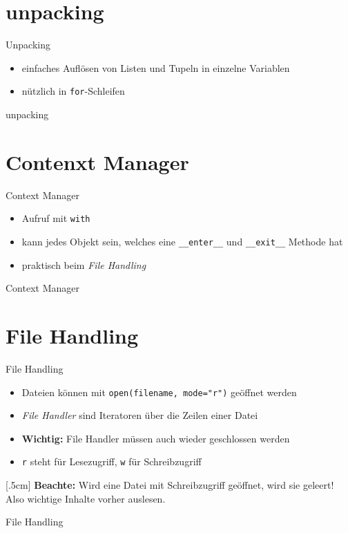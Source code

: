 \section{unpacking}
\begin{frame}{Unpacking}
\begin{itemize}
	\item einfaches Aufl\"osen von Listen und Tupeln in einzelne Variablen
	\item n\"utzlich in \texttt{for}-Schleifen
\end{itemize}
\end{frame}
\begin{frame}{unpacking}
	
\end{frame}

\section{Contenxt Manager}
\begin{frame}{Context Manager}
\begin{itemize}
	\item Aufruf mit \texttt{with}
	\item kann jedes Objekt sein, welches eine \texttt{\_\_enter\_\_} und \texttt{\_\_exit\_\_} Methode hat
	\item praktisch beim \textit{File Handling}
\end{itemize}
\end{frame}
\begin{frame}{Context Manager}
	
\end{frame}

\section{File Handling}
\begin{frame}{File Handling}
\begin{itemize}
	\item Dateien k\"onnen mit \texttt{open(filename, mode="r")} ge\"offnet werden
	\item \textit{File Handler} sind Iteratoren \"uber die Zeilen einer Datei
	\item \textbf{Wichtig:} File Handler m\"ussen auch wieder geschlossen werden
	\item \texttt{r} steht f\"ur Lesezugriff,  \texttt{w} f\"ur Schreibzugriff
\end{itemize}[.5cm]
\textbf{Beachte:} Wird eine Datei mit Schreibzugriff ge\"offnet, wird sie geleert! Also wichtige Inhalte vorher auslesen.
\end{frame}
\begin{frame}{File Handling}
	
\end{frame}


